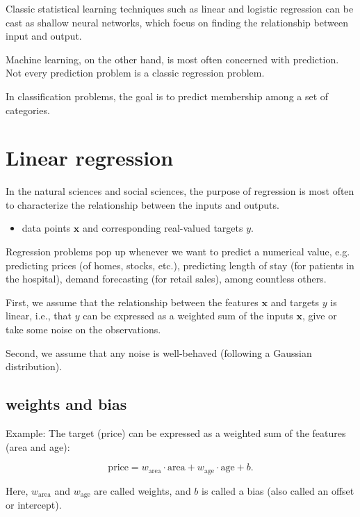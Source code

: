 Classic statistical learning techniques such as linear and logistic regression
can be cast as shallow neural networks, which focus on finding the relationship
between input and output.

Machine learning, on the other hand, is most often concerned with prediction.
Not every prediction problem is a classic regression problem. 

In classification problems, the goal is to predict membership among a set
of categories.

\section{Linear regression}


In the natural sciences and social sciences, the purpose of regression is most
often to characterize the relationship between the inputs and outputs.
\begin{itemize}
  \item  data points $\mathbf{x}$ and corresponding real-valued targets $y$.
\end{itemize}

Regression problems pop up whenever we want to predict a numerical value, e.g.
predicting prices (of homes, stocks, etc.), predicting length of stay (for
patients in the hospital), demand forecasting (for retail sales), among
countless others.

\begin{mdframed}

First, we assume that the relationship between the features $\mathbf{x}$ and targets
$y$ is linear, i.e., that $y$ can be expressed as a weighted sum of the inputs
$\textbf{x}$, give or take some noise on the observations. 


Second, we assume that any noise is well-behaved (following a Gaussian
distribution).

\end{mdframed}
 
\subsection{weights and bias}

Example: The target (price) can be expressed as a weighted sum of the features
(area and age):

$$\mathrm{price} = w_{\mathrm{area}} \cdot \mathrm{area} + w_{\mathrm{age}} \cdot \mathrm{age} + b.$$

Here, $w_{\mathrm{area}}$ and $w_{\mathrm{age}}$ are called weights, and $b$ is
called a bias (also called an offset or intercept).

